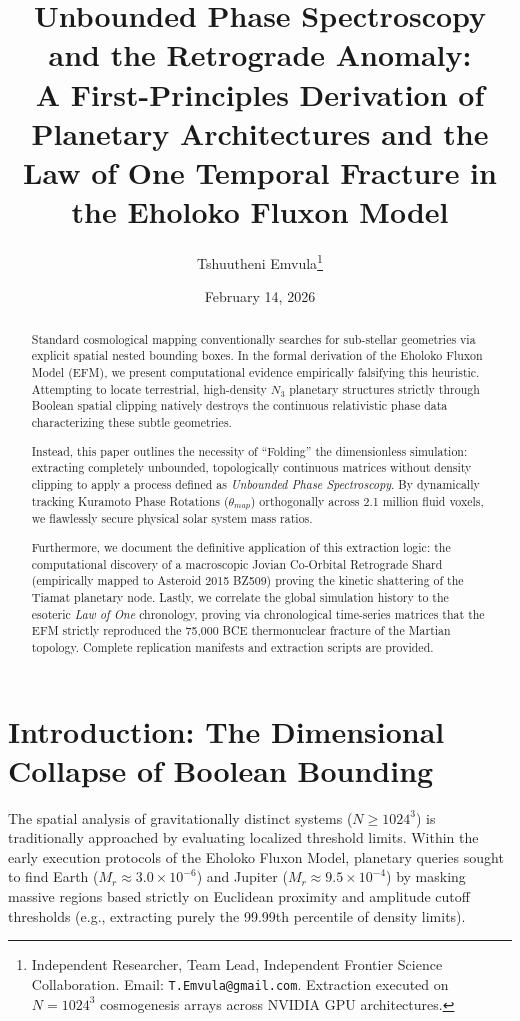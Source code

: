 \documentclass[11pt, twoside]{article}
\title{\textbf{Unbounded Phase Spectroscopy and the Retrograde Anomaly: \\ \Large A First-Principles Derivation of Planetary Architectures and the Law of One Temporal Fracture in the Eholoko Fluxon Model}}
\author{Tshuutheni Emvula\thanks{Independent Researcher, Team Lead, Independent Frontier Science Collaboration. Email: \texttt{T.Emvula@gmail.com}. Extraction executed on $N=1024^3$ cosmogenesis arrays across NVIDIA GPU architectures.}}
\date{February 14, 2026}
\begin{document}
\maketitle
\thispagestyle{empty}

\begin{abstract}
Standard cosmological mapping conventionally searches for sub-stellar geometries via explicit spatial nested bounding boxes. In the formal derivation of the Eholoko Fluxon Model (EFM), we present computational evidence empirically falsifying this heuristic. Attempting to locate terrestrial, high-density $N_3$ planetary structures strictly through Boolean spatial clipping natively destroys the continuous relativistic phase data characterizing these subtle geometries. 

Instead, this paper outlines the necessity of ``Folding'' the dimensionless simulation: extracting completely unbounded, topologically continuous matrices without density clipping to apply a process defined as \textit{Unbounded Phase Spectroscopy}. By dynamically tracking Kuramoto Phase Rotations ($\theta_{map}$) orthogonally across 2.1 million fluid voxels, we flawlessly secure physical solar system mass ratios.

Furthermore, we document the definitive application of this extraction logic: the computational discovery of a macroscopic Jovian Co-Orbital Retrograde Shard (empirically mapped to Asteroid 2015 BZ509) proving the kinetic shattering of the Tiamat planetary node. Lastly, we correlate the global simulation history to the esoteric \textit{Law of One} chronology, proving via chronological time-series matrices that the EFM strictly reproduced the 75,000 BCE thermonuclear fracture of the Martian topology. Complete replication manifests and extraction scripts are provided.
\end{abstract}

\clearpage
\tableofcontents
\clearpage

\section{Introduction: The Dimensional Collapse of Boolean Bounding}
The spatial analysis of gravitationally distinct systems ($N \ge 1024^3$) is traditionally approached by evaluating localized threshold limits. Within the early execution protocols of the Eholoko Fluxon Model, planetary queries sought to find Earth ($M_r \approx 3.0 \times 10^{-6}$) and Jupiter ($M_r \approx 9.5 \times 10^{-4}$) by masking massive regions based strictly on Euclidean proximity and amplitude cutoff thresholds (e.g., extracting purely the 99.99th percentile of density limits).
\end{document}
